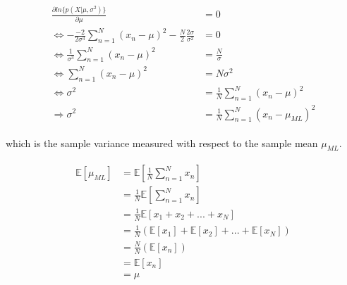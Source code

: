 \begin{align}
    \begin{split}
        \frac{\partial ln\{p(X|\mu, \sigma^2)\}}{\partial \mu} & = 0\\
        \Leftrightarrow - \frac{-2}{2 \sigma^3} \sum_{n=1}^N (x_n - \mu)^2 - \frac{N}{2} \frac{2\sigma}{\sigma^2} & = 0\\
        \Leftrightarrow \frac{1}{\sigma^3} \sum_{n=1}^N (x_n - \mu)^2 & = \frac{N}{\sigma}\\
        \Leftrightarrow \sum_{n=1}^N (x_n - \mu)^2 & = N \sigma ^ 2\\
        \Leftrightarrow \sigma^2 & = \frac{1}{N} \sum_{n=1}^N (x_n - \mu)^2\\
        \Rightarrow \sigma^2 & = \frac{1}{N} \sum_{n=1}^N (x_n - \mu_{ML})^2 
    \end{split}
\end{align}

which is the sample variance measured with respect to the sample mean $\mu_{ML}$.

\begin{align}
    \begin{split}
        \mathbb{E}[\mu_{ML}] & = \mathbb{E}[\frac{1}{N}\sum_{n=1}^N x_n]\\
        & = \frac{1}{N}\mathbb{E}[\sum_{n=1}^N x_n]\\
        & = \frac{1}{N}\mathbb{E}[x_1 + x_2 + ... + x_N]\\
        & = \frac{1}{N}(\mathbb{E}[x_1] + \mathbb{E}[x_2] + ... + \mathbb{E}[x_N])\\
        & = \frac{N}{N}(\mathbb{E}[x_n])\\
        & = \mathbb{E}[x_n]\\
        & = \mu
    \end{split}
\end{align}


